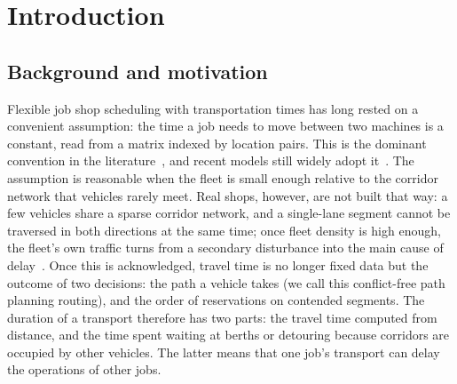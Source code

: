 \renewcommand{\shortauthors}{Qi et al.}






\maketitle
\section{Introduction}
\label{sec:Chapter_I}

\subsection{Background and motivation}

Flexible job shop scheduling with transportation times has long rested on a convenient assumption: the time a job needs to move between two machines is a constant, read from a matrix indexed by location pairs.
This is the dominant convention in the literature~\cite{xin2025review}, and recent models still widely adopt it~\cite{meng2025cp,qin2026knowledge,fu2025integrated}.
The assumption is reasonable when the fleet is small enough relative to the corridor network that vehicles rarely meet.
Real shops, however, are not built that way: a few vehicles share a sparse corridor network, and a single-lane segment cannot be traversed in both directions at the same time; once fleet density is high enough, the fleet's own traffic turns from a secondary disturbance into the main cause of delay~\cite{kim2026congestion}.
Once this is acknowledged, travel time is no longer fixed data but the outcome of two decisions: the path a vehicle takes (we call this conflict-free path planning routing), and the order of reservations on contended segments.
The duration of a transport therefore has two parts: the travel time computed from distance, and the time spent waiting at berths or detouring because corridors are occupied by other vehicles. The latter means that one job's transport can delay the operations of other jobs.

